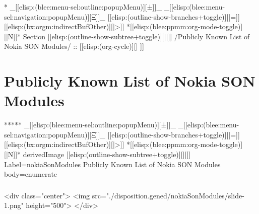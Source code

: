 
\begin{whenOrg}
*  _[[elisp:(blee:menu-sel:outline:popupMenu)][±]]_ _[[elisp:(blee:menu-sel:navigation:popupMenu)][Ξ]]_ [[elisp:(outline-show-branches+toggle)][|=]] [[elisp:(bx:orgm:indirectBufOther)][|>]] *[[elisp:(blee:ppmm:org-mode-toggle)][|N]]*  Section    [[elisp:(outline-show-subtree+toggle)][||]]   /Publicly Known List of Nokia SON Modules/ ::  [[elisp:(org-cycle)][| ]]
\end{whenOrg}

\section{Publicly Known List of Nokia SON Modules}

\begin{whenOrg}
*****  _[[elisp:(blee:menu-sel:outline:popupMenu)][±]]_ _[[elisp:(blee:menu-sel:navigation:popupMenu)][Ξ]]_ [[elisp:(outline-show-branches+toggle)][|=]] [[elisp:(bx:orgm:indirectBufOther)][|>]] *[[elisp:(blee:ppmm:org-mode-toggle)][|N]]*  derivedImage [[elisp:(outline-show-subtree+toggle)][||]] Label=nokiaSonModules Publicly Known List of Nokia SON Modules body=enumerate
\end{whenOrg}

\begin{htmlonly}

\begin{frame}[fragile,plain,label=nokiaSonModules]
    \frametitle{}
    \framesubtitle{}
    \begin{rawhtml}
<div class="center">
<img src="./disposition.gened/nokiaSonModules/slide-1.png" height="500">
</div>
    \end{rawhtml}
\end{frame}
\end{htmlonly}

